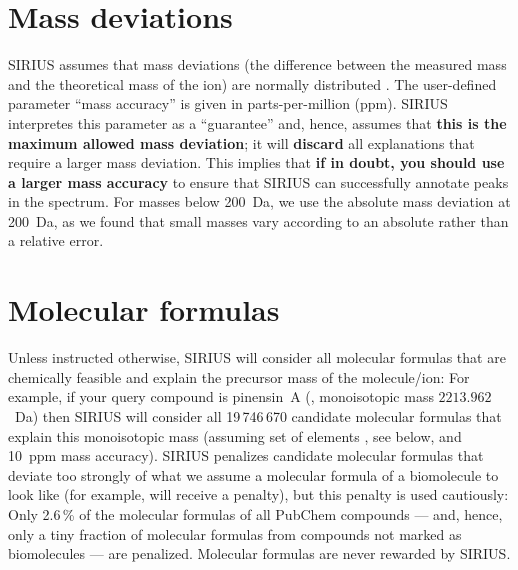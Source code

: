 \documentclass[letterpaper,10pt,openany,oneside]{sphinxmanual}
\begin{document}

\section{Mass deviations}
\label{sec:mass-deviations}

SIRIUS assumes that mass deviations (the difference between the measured
mass and the theoretical mass of the ion) are normally distributed
\citep{jaitly06robust, zubarev07proper, boecker16fragmentation}.  The
user-defined parameter ``mass accuracy'' is given in parts-per-million (ppm).
SIRIUS interpretes this parameter as a ``guarantee'' and, hence, assumes
that \textbf{this is the maximum allowed mass deviation}; it
will \textbf{discard} all explanations that require a larger mass deviation.
This implies that \textbf{if in doubt, you should use a larger mass accuracy}
to ensure that SIRIUS can successfully annotate peaks in the spectrum.  
For masses below 200~Da, we
use the absolute mass deviation at 200~Da, as we found that small masses vary
according to an absolute rather than a relative error.


\section{Molecular formulas}

Unless instructed otherwise, SIRIUS will consider all molecular formulas
that are chemically feasible and explain the precursor mass of the
molecule/ion: For example, if your query compound is pinensin~A
(, monoisotopic mass $2213.962$~Da) then SIRIUS will
consider all 19\,746\,670 candidate molecular formulas that explain this
monoisotopic mass (assuming set of elements , see below, and
10~ppm mass accuracy).  SIRIUS penalizes candidate molecular formulas that
deviate too strongly of what we assume a molecular formula of a biomolecule
to look like (for example,  will receive a penalty), but this
penalty is used cautiously: Only 2.6\,\% of the molecular formulas of all
PubChem compounds --- and, hence, only a tiny fraction of molecular formulas
from compounds not marked as biomolecules --- are penalized.  Molecular
formulas are never rewarded by SIRIUS.
\end{document}
